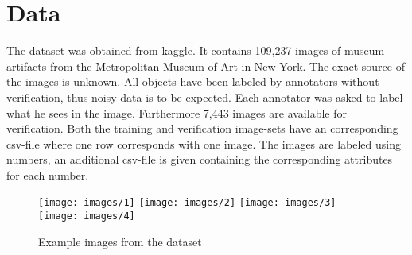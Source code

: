 
\section{Data}
The dataset was obtained from kaggle\cite{DATA}.
It contains 109,237 images of museum artifacts from the Metropolitan Museum of Art in New York.
The exact source of the images is unknown.
All objects have been labeled by  annotators without verification, thus noisy data is to be expected.
Each annotator was asked to label what he sees in the image.
Furthermore 7,443 images are available for verification.
Both the training and verification image-sets have an corresponding csv-file where one row corresponds with one image.
The images are labeled using numbers, an additional csv-file is given containing the corresponding attributes for each number.

\begin{figure}[h]
    \texttt{[image: images/1]}
     \texttt{[image: images/2]}
    \texttt{[image: images/3]}
    \texttt{[image: images/4]}
    \caption{Example images from the dataset}
\end{figure}
